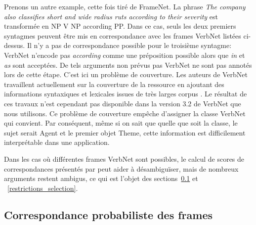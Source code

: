 Prenons un autre example, cette fois tiré de FrameNet. La phrase \textit{The
company also classifies short and wide radius ruts according to their severity}
est transformée en NP V NP according PP. Dans ce cas, seuls les deux premiers
syntagmes peuvent être mis en correspondance avec les frames VerbNet listées
ci-dessus. Il n'y a pas de correspondance possible pour le troisième syntagme:
VerbNet n'encode pas \textit{according} comme une préposition possible alors que
\textit{in} et \textit{as} sont acceptées. De tels arguments non prévus pas VerbNet
ne sont pas annotés lors de cette étape. C'est ici un problème de couverture.
Les auteurs de VerbNet travaillent actuellement sur la couverture de la
ressource en ajoutant des informations syntaxiques et lexicales issues de très
larges corpus \citep{bonial2013expanding}. Le résultat de ces travaux n'est
cependant pas disponible dans la version 3.2 de VerbNet que nous utilisons. Ce
problème de couverture empêche d'assigner la classe VerbNet qui convient. Par
conséquent, même si on sait que quelle que soit la classe, le sujet serait
Agent et le premier objet Theme, cette information est difficilement
interprétable dans une application.

Dans les cas où différentes frames VerbNet sont possibles, le calcul de scores
de correspondances présentés par \cite{swier2004unsupervised} peut aider à
désambiguïser, mais de nombreux arguments restent ambigus, ce qui est l'objet
des sections~\ref{subsec:probability} et ~\ref{restrictions_selection}.





\subsection{Correspondance probabiliste des frames}
\label{subsec:probability}

